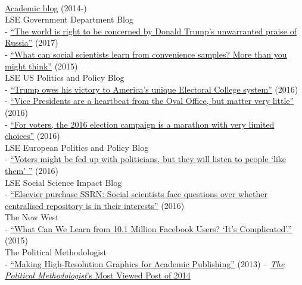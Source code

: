 \documentclass[12pt]{article}
\newcommand{\topic}[1]{\pagebreak[3]\indent {\color{lg}{\footnotesize #1 }}\\}
\newcommand{\entry}[1]{\indent {\color{lg}\guillemotright}\hspace{2pt}#1\vspace{.25em}\\}
\newcommand{\subentry}[1]{{\color{lg}-} #1\vspace{.25em}\\}
\begin{document}
	\topic{Occasional Blogging}
		\entry{\href{http://thomasleeper.com/blog}{Academic blog} (2014-)}
		\entry{LSE Government Department Blog}
			\subentry{\href{http://blogs.lse.ac.uk/government/2017/01/09/the-world-is-right-to-be-concerned-by-donald-trumps-unwarranted-praise-of-russia/}{``The world is right to be concerned by Donald Trump's unwarranted praise of Russia''} (2017)}
			\subentry{\href{http://blogs.lse.ac.uk/government/2016/01/14/what-can-social-scientists-learn-from-convenience-samples-more-than-you-might-think/}{``What can social scientists learn from convenience samples? More than you might think''} (2015)}
		\entry{LSE US Politics and Policy Blog}
			\subentry{\href{http://blogs.lse.ac.uk/usappblog/2016/11/10/trump-owes-his-victory-to-americas-unique-electoral-college-system/}{``Trump owes his victory to America's unique Electoral College system''} (2016)}
			\subentry{\href{http://blogs.lse.ac.uk/usappblog/2016/10/05/vice-presidents-are-a-heartbeat-from-the-oval-office-but-matter-very-little/}{``Vice Presidents are a heartbeat from the Oval Office, but matter very little''} (2016)}
			\subentry{\href{http://blogs.lse.ac.uk/usappblog/2016/09/23/for-voters-the-2016-election-campaign-is-a-marathon-with-very-limited-choices/}{``For voters, the 2016 election campaign is a marathon with very limited choices''} (2016)}
		\entry{LSE European Politics and Policy Blog}
			\subentry{\href{http://blogs.lse.ac.uk/europpblog/2016/06/23/voters-listen-people-like-them/}{``Voters might be fed up with politicians, but they will listen to people `like them' ''} (2016)}
		\entry{LSE Social Science Impact Blog}
			\subentry{\href{http://blogs.lse.ac.uk/impactofsocialsciences/2016/05/18/elsevier-purchase-ssrn-social-scientists-face-questions-over-whether-centralised-repository-is-in-their-interests/}{``Elsevier purchase SSRN: Social scientists face questions over whether centralised repository is in their interests''} (2016)}
		\entry{The New West}
			\subentry{\href{https://thewpsa.wordpress.com/2015/05/09/what-can-we-learn-from-10-1-million-facebook-users-its-complicated/}{``What Can We Learn from 10.1 Million Facebook Users? `It's Complicated'.''} (2015)}
		\entry{The Political Methodologist}
			\subentry{\href{https://thepoliticalmethodologist.com/2013/11/25/making-high-resolution-graphics-for-academic-publishing/}{``Making High-Resolution Graphics for Academic Publishing''} (2013) -- \href{http://thepoliticalmethodologist.com/2015/01/05/introducing-the-annual-tpm-most-viewed-post-award-and-our-2014-winner/}{\textit{The Political Methodologist}'s Most Viewed Post of 2014}}
\end{document}
